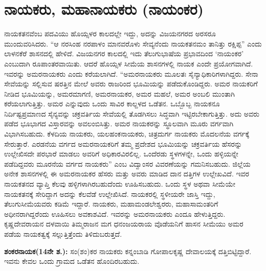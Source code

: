 \section{ನಾಯಕರು, ಮಹಾನಾಯಕರು (ನಾಯಂಕರ)}

ನಾಯಕತನವೆಂಬ ಪದವಿಯು ಹೊಯ್ಸಳರ ಕಾಲದಲ್ಲೇ ಇದ್ದು, ಅದನ್ನು ವಿಜಯನಗರದ ಅರಸರೂ ಮುಂದುವರಿಸಿದರು. “ಆ ನರಸಿಂಹ ನರಪಾಳಂ ಮಾನವರೊಳು ಸೇವ್ಯನೆಂದು ನಾಯಕತನಮಂ ತಾನಿತ್ತು ರಕ್ಷಿಪ್ಪ” ಎಂದು ಲಾಳನಕೆರೆ ಶಾಸನದಲ್ಲಿ ಹೇಳಿದೆ. ವಿಜಯನಗರ ಕಾಲದಲ್ಲಿ ಇದು ತೆಲುಗುಭಾಷೆಯ ಪ್ರಭಾವದಿಂದ ‘ನಾಯಂಕರ’ ಎಂಬುದಾಗಿ ರೂಪಾಂತರ\-ವಾಯಿತು. ಆದರೆ ಹೊಯ್ಸಳ ಸೀಮೆಯ ಶಾಸನಗಳಲ್ಲಿ ನಾಯಕ ಎಂದೇ ಪ್ರಯೋಗವಾಗಿದೆ. ಇವರನ್ನು ಅಮರನಾಯಕರು ಎಂದು ಕರೆಯಲಾಗಿದೆ. “ಅಮರನಾಯಕರು ಮೂಲತಃ ಸೈನ್ಯಾಧಿಕಾರಿಗಳಾಗಿದ್ದರು. ಸೇನಾ ಸೇವೆಯನ್ನು ಸಲ್ಲಿಸುವ ಷರತ್ತಿನ ಮೇಲೆ ಅವರು ರಾಜರಿಂದ ಭೂಮಿಯನ್ನು ಪಡೆದುಕೊಂಡಿದ್ದರು. ಅಮರ ನಾಯಕರಿಗೆ ನೀಡಿದ ಭೂಮಿಯನ್ನು, ಅಮರಮಾಗಣಿ, ಅಮರನಾಯಕರ, ಅಮರ ಮಹಲೆ, ಅಮರ ಅಂಬಲಿ ಮುಂತಾಗಿ ಕರೆಯಲಾಗುತ್ತಿತ್ತು. ಅಮರ ಎನ್ನುವುದು ಒಂದು ಸಾವಿರ ಕಾಲ್ದಳದ ಒಡೆತನ. ಒಬ್ಬೊಬ್ಬ ನಾಯಕನೂ ನಿರ್ದಿಷ್ಟಪ್ರಮಾಣದ ಸೈನ್ಯವನ್ನು ಚಕ್ರವರ್ತಿಯ ಸೇವೆಯಲ್ಲಿ ತೊಡಗಿಸಲು ಸಿದ್ಧವಾಗಿ ಇಟ್ಟಿರಬೇಕಾಗುತ್ತಿತ್ತು. ಅದು ಅವರು ಪಡೆದ ಭೂಭಾಗದ ವಿಸ್ತಾರವನ್ನು ಅವಲಂಬಿಸಿತ್ತು. ಅಮರ ನಾಯಕರನ್ನು ಸ್ಥೂಲವಾಗಿ ಮೂರು ವರ್ಗವಾಗಿ ವಿಭಾಗಿಸಬಹುದು. ಕೆಳದಿಯ ನಾಯಕರು, ಯಲಹಂಕನಾಯಕರು, ಚಿತ್ರದುರ್ಗ ನಾಯಕರು ಮೊದಲನೆಯ ವರ್ಗಕ್ಕೆ ಸೇರುತ್ತಾರೆ. ಎರಡನೆಯ ವರ್ಗದ ಅಮರನಾಯಕರಿಗೆ ತಮ್ಮ ಪ್ರದೇಶದ ಭೂಮಿಯನ್ನು ಚಕ್ರವರ್ತಿಯ ಹೆಸರನ್ನು ಉಲ್ಲೇಖಿಸದೇ ಪರಭಾರೆ ಮಾಡಲು ಅವರಿಗೆ ಅಧಿಕಾರವಿರಲಿಲ್ಲ. ಒಂದೆರಡು ಸ್ಥಳಗಳನ್ನೇ, ಒಂದು ಹಳ್ಳಿಯನ್ನೇ ಪಡೆದಿದ್ದವರು ಮೂರನೆಯ ವರ್ಗದ ನಾಯಕರು” ಎಂಬ ವಿದ್ವಾಂಸರ ವಿವರಣೆಯನ್ನು ಗಮನಿಸಬಹುದು. ಜಿಲ್ಲೆಯ ಅನೇಕ ಶಾಸನಗಳಲ್ಲಿ ಈ ಅಮರನಾಯಕರ ಹೆಸರು ಮತ್ತು ಅವರು ಮಾಡಿದ ದಾನ ದತ್ತಿಗಳ ಉಲ್ಲೇಖವಿದೆ. ಇವರ ನಾಯಕತನದ ವ್ಯಾಪ್ತಿ ಕೆಲವು ಹಳ್ಳಿಗಳಾಗಿರಬಹುದೆಂದು ಊಹಿಸಬಹುದು. ಒಂದು ಸ್ಥಳ ಅಥವಾ ಸೀಮೆಯೇ ನಾಯಕತನಕ್ಕೆ ಸೇರಿದ್ದಾಗ ಅದನ್ನು ಕೆಲವೆಡೆ ಉಲ್ಲೇಖಿಸಿದೆ. ನಾಯಕರಲ್ಲಿ ಸ್ಥಳೀಯರೇ ಜಾಸ್ತಿ ಇದ್ದು, ತೆಲುಗುಸೀಮೆಯವರು ಕಡಿಮೆ ಇದ್ದಾರೆ. ನಾಯಕರು, ಮಹಾಮಂಡಲೇಶ್ವರರು, ಮಹಾಸಾಮಂತರಿಗೆ ಅಧೀನರಾಗಿದ್ದರೆಂದು ಊಹಿಸಲು ಅವಕಾಶವಿದೆ. ಇವರನ್ನು ಅಮರನಾಯಕರು ಎಂದೂ ಹೇಳುತ್ತಿದ್ದರು. ಕೃಷ್ಣದೇವರಾಯನ ದಳವಾಯಿ ತಿಮ್ಮರಾಜನ ಮಗ ಧನಂಜಯರಾಯ ವೊಡೆಯನಿಗೆ ಹಾಸನ ಸೀಮೆಯು ಅಮರ ಪಡೆಯ ನಾಯಕತ್ವಕ್ಕೆ ಸಲ್ಲುತ್ತಿತ್ತೆಂದು ತಿಳಿದುಬರುತ್ತದೆ.

\textbf{ಶಂಕರನಾಯಕ(14ನೇ ಶ.):} ಸಂ(ಶಂ)ಕರ ನಾಯಕರು ಕನ್ನಂಬಾಡಿ ಗೋಪಾಲಕೃಷ್ಣ ದೇವಾಲಯಕ್ಕೆ ದತ್ತಿ\break ಬಿಟ್ಟಿದ್ದಾರೆ. ಇವನು ಕೇವಲ ಒಂದು ಗ್ರಾಮದ ಒಡೆತನ ಹೊಂದಿರಬಹುದು.

